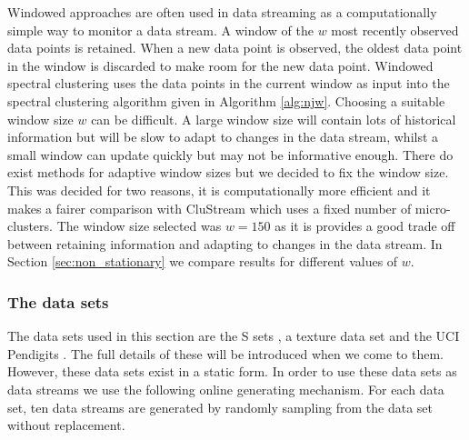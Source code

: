 Windowed approaches are often used in data streaming as a computationally simple way to monitor a data stream. A window of the $w$ most recently observed data points is retained. When a new data point is observed, the oldest data point in the window is discarded to make room for the new data point. Windowed spectral clustering uses the data points in the current window as input into the spectral clustering algorithm given in  Algorithm \ref{alg:njw}. Choosing a suitable window size $w$ can be difficult. A large window size will contain lots of historical information but will be slow to adapt to changes in the data stream, whilst a small window can update quickly but may not be informative enough. There do exist methods for adaptive window sizes but we decided to fix the window size. This was decided for two reasons, it is computationally more efficient and it makes a fairer comparison with CluStream which uses a fixed number of micro-clusters. The window size selected was $w = 150$ as it is provides a good trade off between retaining information and adapting to changes in the data stream. In Section \ref{sec:non_stationary} we compare results for different values of $w$.


\subsubsection{The data sets}
The data sets used in this section are the S sets \citep{Franti2006}, a texture data set \citep{kylberg2011c} and the UCI Pendigits \citep{Lichman2013}. The full details of these will be introduced when we come to them. However, these data sets exist in a static form. In order to use these data sets as data streams we use the following online generating mechanism. For each data set, ten data streams are generated by randomly sampling from the data set without replacement. 

